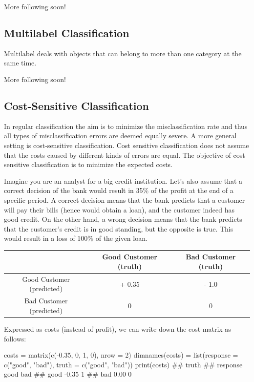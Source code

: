 \documentclass[]{article}
\newenvironment{Shaded}{}{}
\newcommand{\DataTypeTok}[1]{#1}
\newcommand{\DecValTok}[1]{#1}
\newcommand{\FloatTok}[1]{#1}
\newcommand{\KeywordTok}[1]{\textcolor[rgb]{0.00,0.00,1.00}{#1}}
\newcommand{\NormalTok}[1]{#1}
\newcommand{\OperatorTok}[1]{#1}
\newcommand{\StringTok}[1]{\textcolor[rgb]{0.00,0.50,0.50}{#1}}
\renewenvironment{Shaded} {\begin{snugshade}\small} {\end{snugshade}}
\begin{document}
More following soon!

\hypertarget{multilabel}{%
\subsection{Multilabel Classification}\label{multilabel}}

Multilabel deals with objects that can belong to more than one category at the same time.

More following soon!

\hypertarget{cost-sens}{%
\subsection{Cost-Sensitive Classification}\label{cost-sens}}

In regular classification the aim is to minimize the misclassification rate and thus all types of misclassification errors are deemed equally severe.
A more general setting is cost-sensitive classification.
Cost sensitive classification does not assume that the costs caused by different kinds of errors are equal.
The objective of cost sensitive classification is to minimize the expected costs.

Imagine you are an analyst for a big credit institution.
Let's also assume that a correct decision of the bank would result in 35\% of the profit at the end of a specific period.
A correct decision means that the bank predicts that a customer will pay their bills (hence would obtain a loan), and the customer indeed has good credit.
On the other hand, a wrong decision means that the bank predicts that the customer's credit is in good standing, but the opposite is true.
This would result in a loss of 100\% of the given loan.

\begin{longtable}[]{@{}ccc@{}}
\toprule
& Good Customer (truth) & Bad Customer (truth)\tabularnewline
\midrule
\endhead
Good Customer (predicted) & + 0.35 & - 1.0\tabularnewline
Bad Customer (predicted) & 0 & 0\tabularnewline
\bottomrule
\end{longtable}

Expressed as costs (instead of profit), we can write down the cost-matrix as follows:

\begin{Shaded}
\begin{Highlighting}[]
\NormalTok{costs =}\StringTok{ }\KeywordTok{matrix}\NormalTok{(}\KeywordTok{c}\NormalTok{(}\OperatorTok{-}\FloatTok{0.35}\NormalTok{, }\DecValTok{0}\NormalTok{, }\DecValTok{1}\NormalTok{, }\DecValTok{0}\NormalTok{), }\DataTypeTok{nrow =} \DecValTok{2}\NormalTok{)}
\KeywordTok{dimnames}\NormalTok{(costs) =}\StringTok{ }\KeywordTok{list}\NormalTok{(}\DataTypeTok{response =} \KeywordTok{c}\NormalTok{(}\StringTok{"good"}\NormalTok{, }\StringTok{"bad"}\NormalTok{), }\DataTypeTok{truth =} \KeywordTok{c}\NormalTok{(}\StringTok{"good"}\NormalTok{, }\StringTok{"bad"}\NormalTok{))}
\KeywordTok{print}\NormalTok{(costs)}
\NormalTok{##         truth}
\NormalTok{## response  good bad}
\NormalTok{##     good -0.35   1}
\NormalTok{##     bad   0.00   0}
\end{Highlighting}
\end{Shaded}
\end{document}
